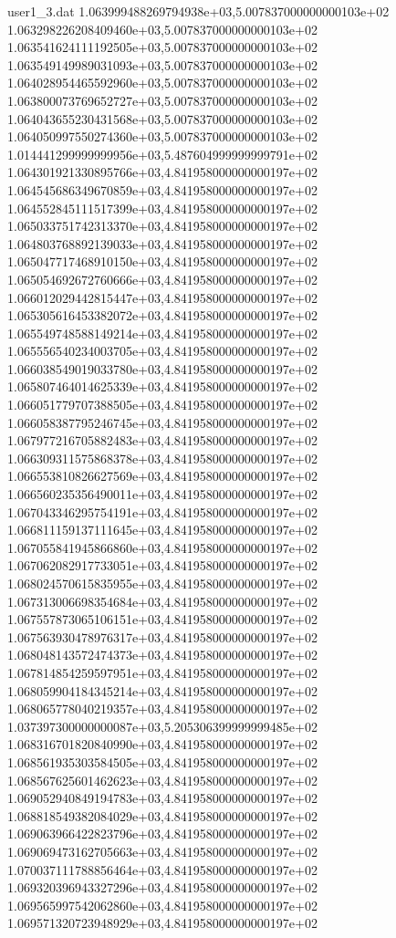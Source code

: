 \begin{filecontents}{user1_3.dat}
1.063999488269794938e+03,5.007837000000000103e+02
1.063298226208409460e+03,5.007837000000000103e+02
1.063541624111192505e+03,5.007837000000000103e+02
1.063549149989031093e+03,5.007837000000000103e+02
1.064028954465592960e+03,5.007837000000000103e+02
1.063800073769652727e+03,5.007837000000000103e+02
1.064043655230431568e+03,5.007837000000000103e+02
1.064050997550274360e+03,5.007837000000000103e+02
1.014441299999999956e+03,5.487604999999999791e+02
1.064301921330895766e+03,4.841958000000000197e+02
1.064545686349670859e+03,4.841958000000000197e+02
1.064552845111517399e+03,4.841958000000000197e+02
1.065033751742313370e+03,4.841958000000000197e+02
1.064803768892139033e+03,4.841958000000000197e+02
1.065047717468910150e+03,4.841958000000000197e+02
1.065054692672760666e+03,4.841958000000000197e+02
1.066012029442815447e+03,4.841958000000000197e+02
1.065305616453382072e+03,4.841958000000000197e+02
1.065549748588149214e+03,4.841958000000000197e+02
1.065556540234003705e+03,4.841958000000000197e+02
1.066038549019033780e+03,4.841958000000000197e+02
1.065807464014625339e+03,4.841958000000000197e+02
1.066051779707388505e+03,4.841958000000000197e+02
1.066058387795246745e+03,4.841958000000000197e+02
1.067977216705882483e+03,4.841958000000000197e+02
1.066309311575868378e+03,4.841958000000000197e+02
1.066553810826627569e+03,4.841958000000000197e+02
1.066560235356490011e+03,4.841958000000000197e+02
1.067043346295754191e+03,4.841958000000000197e+02
1.066811159137111645e+03,4.841958000000000197e+02
1.067055841945866860e+03,4.841958000000000197e+02
1.067062082917733051e+03,4.841958000000000197e+02
1.068024570615835955e+03,4.841958000000000197e+02
1.067313006698354684e+03,4.841958000000000197e+02
1.067557873065106151e+03,4.841958000000000197e+02
1.067563930478976317e+03,4.841958000000000197e+02
1.068048143572474373e+03,4.841958000000000197e+02
1.067814854259597951e+03,4.841958000000000197e+02
1.068059904184345214e+03,4.841958000000000197e+02
1.068065778040219357e+03,4.841958000000000197e+02
1.037397300000000087e+03,5.205306399999999485e+02
1.068316701820840990e+03,4.841958000000000197e+02
1.068561935303584505e+03,4.841958000000000197e+02
1.068567625601462623e+03,4.841958000000000197e+02
1.069052940849194783e+03,4.841958000000000197e+02
1.068818549382084029e+03,4.841958000000000197e+02
1.069063966422823796e+03,4.841958000000000197e+02
1.069069473162705663e+03,4.841958000000000197e+02
1.070037111788856464e+03,4.841958000000000197e+02
1.069320396943327296e+03,4.841958000000000197e+02
1.069565997542062860e+03,4.841958000000000197e+02
1.069571320723948929e+03,4.841958000000000197e+02

\end{filecontents}

